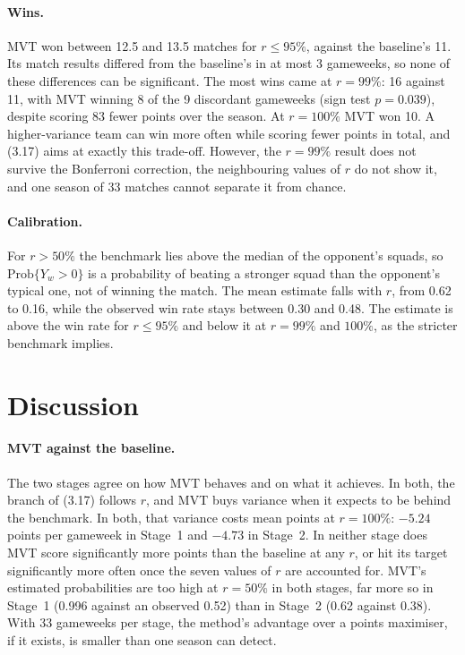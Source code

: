 \documentclass[12pt,oneside,a4paper]{book}
\theoremstyle{definition}
\theoremstyle{remark}
\begin{document}
	\paragraph{Wins.} MVT won between 12.5 and 13.5 matches for $r\le 95\%$, against the baseline's
	11. Its match results differed from the baseline's in at most 3 gameweeks, so none of these
	differences can be significant. The most wins came at $r=99\%$: 16 against 11, with MVT winning
	8 of the 9 discordant gameweeks (sign test $p=0.039$), despite scoring 83 fewer points over the
	season. At $r=100\%$ MVT won 10. A higher-variance team can win more often while scoring fewer
	points in total, and (3.17) aims at exactly this trade-off. However, the $r=99\%$ result does not
	survive the Bonferroni correction, the neighbouring values of $r$ do not show it, and one season
	of 33 matches cannot separate it from chance.

	\paragraph{Calibration.} For $r>50\%$ the benchmark lies above the median of the opponent's
	squads, so $\mathrm{Prob}\{Y_w>0\}$ is a probability of beating a stronger squad than the
	opponent's typical one, not of winning the match. The mean estimate falls with $r$, from 0.62
	to 0.16, while the observed win rate stays between 0.30 and 0.48. The estimate is above the win
	rate for $r\le 95\%$ and below it at $r=99\%$ and $100\%$, as the stricter benchmark implies.

	\section{Discussion}
	\label{sec:discussion}

	\paragraph{MVT against the baseline.} The two stages agree on how MVT behaves and on what it
	achieves. In both, the branch of (3.17) follows $r$, and MVT buys variance when it expects to be
	behind the benchmark. In both, that variance costs mean points at $r=100\%$: $-5.24$ points per
	gameweek in Stage~1 and $-4.73$ in Stage~2. In neither stage does MVT score significantly more
	points than the baseline at any $r$, or hit its target significantly more often once the
	seven values of $r$ are accounted for. MVT's estimated probabilities are too high at $r=50\%$ in
	both stages, far more so in Stage~1 (0.996 against an observed 0.52) than in Stage~2 (0.62
	against 0.38). With 33 gameweeks per stage, the method's advantage over a points maximiser, if
	it exists, is smaller than one season can detect.
\end{document}
